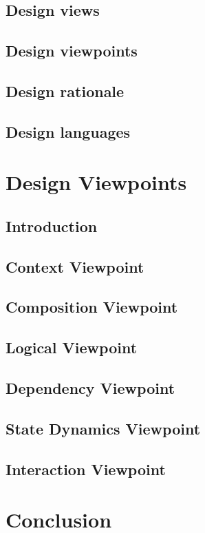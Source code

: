 \documentclass[letterpaper,10pt,draftclsnofoot,onecolumn,titlepage]{IEEEtran}
\begin{document}
		\subsection{Design views}
		
		\subsection{Design viewpoints}
		
		\subsection{Design rationale}
		
		\subsection{Design languages}
		
	\section{Design Viewpoints}
	
		\subsection{Introduction}
		
		\subsection{Context Viewpoint}
		
		\subsection{Composition Viewpoint}
		
		\subsection{Logical Viewpoint}
		
		\subsection{Dependency Viewpoint}
		
		\subsection{State Dynamics Viewpoint}
		
		\subsection{Interaction Viewpoint}
		
	\section{Conclusion}
	
	
\end{document}
